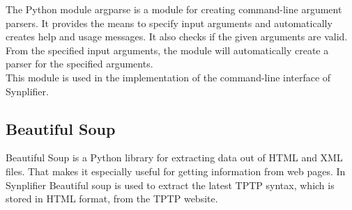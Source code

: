 The Python module argparse is a module for creating command-line argument parsers.
It provides the means to specify input arguments and automatically creates help and usage messages.
It also checks if the given arguments are valid.
From the specified input arguments, the module will automatically create a parser for the specified arguments. \cite{argparse}\\
This module is used in the implementation of the command-line interface of \ac{Synplifier}.

\subsection{Beautiful Soup}\label{sec:BackgroundBeautifulSoup}

Beautiful Soup is a Python library for extracting data out of HTML and XML files.
That makes it especially useful for getting information from web pages. \cite{BeautifulSoup,BeautifulSoupDoku}
In \ac{Synplifier} Beautiful soup is used to extract the latest \ac{TPTP} syntax, which is stored in HTML format, from the \ac{TPTP} website.
